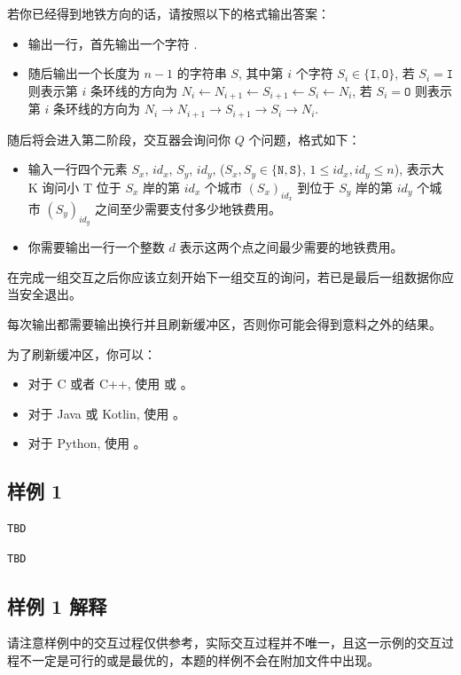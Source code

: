 若你已经得到地铁方向的话，请按照以下的格式输出答案：

\begin{itemize}
   \item 输出一行，首先输出一个字符 \TT{!}.
   \item 随后输出一个长度为 $n - 1$ 的字符串 $S$, 其中第 $i$ 个字符 $S_i \in \{\mathtt{I}, \mathtt{O}\}$, 若 $S_i = \mathtt{I}$ 则表示第 $i$ 条环线的方向为 $N_i \leftarrow N_{i + 1} \leftarrow S_{i + 1} \leftarrow S_i \leftarrow N_i$, 若 $S_i = \mathtt{O}$ 则表示第 $i$ 条环线的方向为 $N_i \rightarrow N_{i + 1} \rightarrow S_{i + 1} \rightarrow S_i \rightarrow N_i$.
\end{itemize}

随后将会进入第二阶段，交互器会询问你 $Q$ 个问题，格式如下：

\begin{itemize}
   \item 输入一行四个元素 $S_x$, $id_x$, $S_y$, $id_y$, ($S_x, S_y \in \{\mathtt{N}, \mathtt{S}\}$, $1 \le id_x, id_y \le n$), 表示大 K 询问小 T 位于 $S_x$ 岸的第 $id_x$ 个城市 $(S_x)_{id_x}$ 到位于 $S_y$ 岸的第 $id_y$ 个城市 $(S_y)_{id_y}$ 之间至少需要支付多少地铁费用。
   \item 你需要输出一行一个整数 $d$ 表示这两个点之间最少需要的地铁费用。
\end{itemize}

在完成一组交互之后你应该立刻开始下一组交互的询问，若已是最后一组数据你应当安全退出。

每次输出都需要输出换行并且刷新缓冲区，否则你可能会得到意料之外的结果。

为了刷新缓冲区，你可以：

\begin{itemize}
   \item 对于 C 或者 C++, 使用  或 。
   \item 对于 Java 或 Kotlin, 使用 。
   \item 对于 Python, 使用 。
\end{itemize}

\subsection{样例 1}

\begin{minipage}{\linewidth}
	\begin{minipage}[t]{0.49\linewidth}
		\begin{lstlisting}[title=\texttt{standard input}]
TBD
\end{lstlisting}
	\end{minipage}
	\begin{minipage}[t]{0.49\linewidth}
		\begin{lstlisting}[title=\texttt{standard output}]
TBD
\end{lstlisting}
	\end{minipage}
\end{minipage}


\subsection{样例 1 解释}

请注意样例中的交互过程仅供参考，实际交互过程并不唯一，且这一示例的交互过程不一定是可行的或是最优的，本题的样例不会在附加文件中出现。





